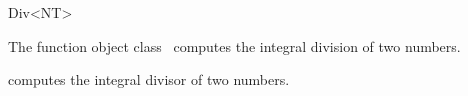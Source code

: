 \begin{ccRefFunctionObjectClass}{Div<NT>}

\ccDefinition

The function object class \ccRefName\ computes the integral division of two 
numbers.


\ccIsModel
{}

{computes the integral divisor of two numbers.}


\end{ccRefFunctionObjectClass}
